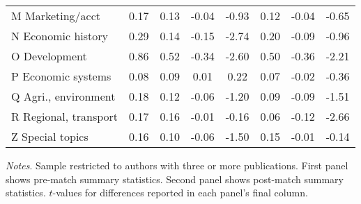\begin{table}[H]
\begin{adjustwidth}{-0.085cm}{}
\begin{threeparttable}
\begin{tabular}{p{3.55cm}S[group-separator={}]@{}S[group-separator={}]@{}S@{}S@{}S[group-separator={}]@{}S@{}S@{}}
            \quad M Marketing/acct&        0.17&        0.13&       -0.04&       -0.93&        0.12&       -0.04&       -0.65\\
            \quad N Economic history&        0.29&        0.14&       -0.15&       -2.74&        0.20&       -0.09&       -0.96\\
            \quad O Development &        0.86&        0.52&       -0.34&       -2.60&        0.50&       -0.36&       -2.21\\
            \quad P Economic systems&        0.08&        0.09&        0.01&        0.22&        0.07&       -0.02&       -0.36\\
            \quad Q Agri., environment&        0.18&        0.12&       -0.06&       -1.20&        0.09&       -0.09&       -1.51\\
            \quad R Regional, transport&        0.17&        0.16&       -0.01&       -0.16&        0.06&       -0.12&       -2.66\\
            \quad Z Special topics&        0.16&        0.10&       -0.06&       -1.50&        0.15&       -0.01&       -0.14\\
            \bottomrule
        \end{tabular}
        \begin{tablenotes}
            \tiny
            \item \textit{Notes}. Sample restricted to authors with three or more publications. First panel shows pre-match summary statistics. Second panel shows post-match summary statistics. \(t\)-values for differences reported in each panel's final column.
        \end{tablenotes}
    \end{threeparttable}
    \end{adjustwidth}
\end{table}